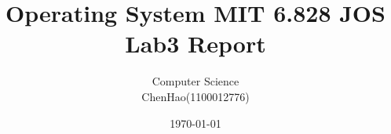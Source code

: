 \documentclass[GBK,winfonts,a4paper,10pt]{ctexart}
\begin{document}
\rhead{}
\lhead{}
\cfoot{\thepage}
\renewcommand{\footrulewidth}{0.4pt}
\renewcommand{\algorithmicrequire}{\textbf{Input:}}
\renewcommand{\algorithmicensure}{\textbf{Output:}}
\setlength{\tabcolsep}{2pt}

\setlength{\parindent}{2em}

\thispagestyle{fancy}


\title{Operating System MIT 6.828 JOS Lab3 Report}
\author{Computer Science \\ ChenHao(1100012776) }
\date{\today}
\maketitle

\thispagestyle{fancy}

\tableofcontents

\newpage
\end{document}
